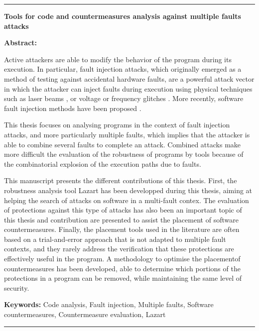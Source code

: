 \documentclass[a4paper,10pt,twoside]{lib/StyleThese}
\begin{document}
\newpage
\begin{vcenterpage}
    \noindent\rule[2pt]{\textwidth}{0.5pt}
    \begin{center}
    {\large\textbf{Tools for code and countermeasures analysis against multiple faults attacks\\}}
    \end{center}
    {\large\textbf{Abstract:}}
    
        Active attackers are able to modify the behavior of the program during its execution. In particular, fault injection attacks, which originally emerged as a method of testing against accidental hardware faults, are a powerful attack vector in which the attacker can inject faults during execution using physical techniques such as laser beams \cite{Roscian/FDTC13, Colombier/HOST19}, or voltage \cite{BarEl/IEEE06} or frequency glitches \cite{Agoyan/SCRAA10, Yuce/HSS18}. More recently, software fault injection methods have been proposed \cite{Park/IIRW14}.
        
        This thesis focuses on analysing programs in the context of fault injection attacks, and more particularly multiple faults, which implies that the attacker is able to combine several faults to complete an attack.
        Combined attacks make more difficult the evaluation of the robustness of programs by tools because of the combinatorial explosion of the execution paths due to faults.
        
        This manuscript presents the different contributions of this thesis.
        First, the robustness analysis tool Lazart has been developped during this thesis, aiming at helping the
        search of attacks on software in a multi-fault contex.
        The evaluation of protections against this type of attacks has also been an important topic of this thesis and contribution are presented to assist the placement of software countermeasures.
        Finally, the placement tools used in the literature are often based on a trial-and-error approach that is not adapted to multiple fault contexts, and they rarely address the verification that these protections are effectively useful in the program. A methodology to optimise the placementof countermeasures has been developed, able to determine which portions of the protections in a program can be removed,  while maintaining the same level of security.
    
    {\large\textbf{Keywords:}}
    Code analysis, Fault injection, Multiple faults, Software countermeasures, Countermeasure evaluation, Lazart
    \\
    \noindent\rule[2pt]{\textwidth}{0.5pt}
\end{vcenterpage}
\end{document}
